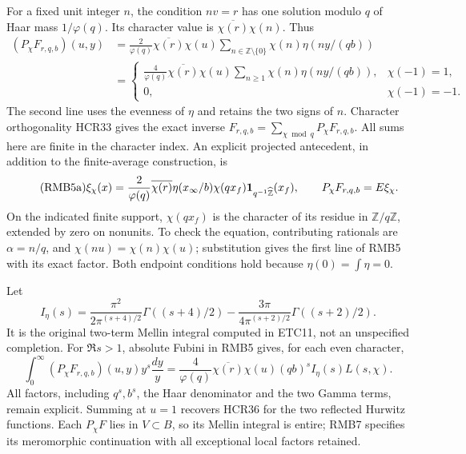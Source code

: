\documentclass[11pt]{article}
\begin{document}
For a fixed unit integer $n$, the condition $nv=r$ has one
solution modulo $q$ of Haar mass $1/\varphi(q)$. Its character
value is $\overline{\chi(r)}\chi(n)$. Thus
\begin{equation}\tag{RMB5}
 \begin{split}
 (P_\chi F_{r,q,b})(u,y)
 &=\frac{2}{\varphi(q)}\overline{\chi(r)}\chi(u)
       \sum_{n\in\mathbb Z\setminus\{0\}}
                \chi(n)\eta(ny/(qb))\\
 &=
 \begin{cases}
 \displaystyle
 \frac4{\varphi(q)}\overline{\chi(r)}\chi(u)
              \sum_{n\ge1}\chi(n)\eta(ny/(qb)),
                       &\chi(-1)=1,\\
 0,&\chi(-1)=-1.
 \end{cases}
 \end{split}
\end{equation}
The second line uses the evenness of $\eta$ and retains the
two signs of $n$. Character orthogonality HCR33 gives the
exact inverse $F_{r,q,b}=\sum_{\chi\bmod q}P_\chi F_{r,q,b}$.
All sums here are finite in the character index.
An explicit projected antecedent, in addition to the finite-average
construction, is
\begin{equation}\tag{RMB5a}
 \xi_\chi(x)=\frac2{\varphi(q)}\overline{\chi(r)}
       \eta(x_\infty/b)\chi(qx_f)
              {\bf1}_{q^{-1}\widehat{\mathbb Z}}(x_f),
 \qquad P_\chi F_{r,q,b}=E\xi_\chi.
\end{equation}
On the indicated finite support, $\chi(qx_f)$ is the character
of its residue in $\mathbb Z/q\mathbb Z$, extended by zero
on nonunits. To check the equation, contributing rationals
are $\alpha=n/q$, and $\chi(nu)=\chi(n)\chi(u)$;
substitution gives the first line of RMB5 with its exact factor.
Both endpoint conditions hold because $\eta(0)=\int\eta=0$.

Let
\begin{equation}\tag{RMB6}
 I_\eta(s)=
 \frac{\pi^2}{2\pi^{(s+4)/2}}\Gamma((s+4)/2)
 -\frac{3\pi}{4\pi^{(s+2)/2}}\Gamma((s+2)/2).
\end{equation}
It is the original two-term Mellin integral computed in ETC11,
not an unspecified completion. For $\Re s>1$, absolute
Fubini in RMB5 gives, for each even character,
\begin{equation}\tag{RMB7}
 \int_0^\infty(P_\chi F_{r,q,b})(u,y)y^s\frac{dy}{y}
  =\frac4{\varphi(q)}\overline{\chi(r)}\chi(u)
                       (qb)^s I_\eta(s)L(s,\chi).
\end{equation}
All factors, including $q^s,b^s$, the Haar denominator and
the two Gamma terms, remain explicit. Summing at $u=1$
recovers HCR36 for the two reflected Hurwitz functions.
Each $P_\chi F$ lies in $V\subset B$, so its Mellin integral
is entire; RMB7 specifies its meromorphic continuation with
all exceptional local factors retained.
\end{document}
